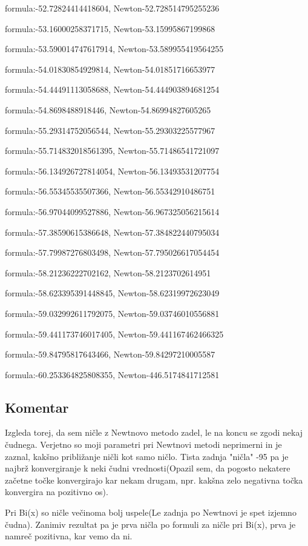 \documentclass{article}
\begin{document}
formula:-52.72824414418604, Newton-52.728514795255236

formula:-53.16000258371715, Newton-53.15995867199868

formula:-53.590014747617914, Newton-53.589955419564255

formula:-54.01830854929814, Newton-54.01851716653977

formula:-54.44491113058688, Newton-54.444903894681254

formula:-54.8698488918446, Newton-54.86994827605265

formula:-55.29314752056544, Newton-55.29303225577967

formula:-55.714832018561395, Newton-55.71486541721097

formula:-56.134926727814054, Newton-56.13493531207754

formula:-56.55345535507366, Newton-56.55342910486751

formula:-56.97044099527886, Newton-56.967325056215614

formula:-57.38590615386648, Newton-57.384822440795034

formula:-57.79987276803498, Newton-57.795026617054454

formula:-58.21236222702162, Newton-58.2123702614951

formula:-58.623395391448845, Newton-58.62319972623049

formula:-59.032992611792075, Newton-59.03746010556881

formula:-59.441173746017405, Newton-59.441167462466325

formula:-59.84795817643466, Newton-59.84297210005587

formula:-60.253364825808355, Newton-446.5174841712581

\subsection{Komentar}
Izgleda torej, da sem ničle z Newtnovo metodo zadel, le na koncu se zgodi nekaj čudnega. Verjetno so moji parametri pri Newtnovi metodi neprimerni in je zaznal, kakšno približanje ničli kot samo ničlo. Tista zadnja "ničla" -95 pa je najbrž konvergiranje k neki čudni vrednosti(Opazil sem, da pogosto nekatere začetne točke konvergirajo kar nekam drugam, npr. kakšna zelo negativna točka konvergira na pozitivno os).

 Pri Bi(x) so ničle večinoma bolj uspele(Le zadnja po Newtnovi je spet izjemno čudna). Zanimiv rezultat pa je prva ničla po formuli za ničle pri Bi(x), prva je namreč pozitivna, kar vemo da ni. 
\end{document}
